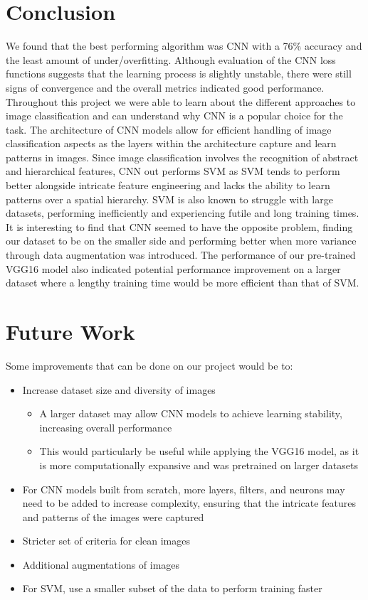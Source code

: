 %

\section{Conclusion}
We found that the best performing algorithm was CNN with a 76\% accuracy and the least amount of under/overfitting. Although evaluation of the CNN loss functions suggests that the learning process is slightly unstable, there were still signs of convergence and the overall metrics indicated good performance. Throughout this project we were able to learn about the different approaches to image classification and can understand why CNN is a popular choice for the task. The architecture of CNN models allow for efficient handling of image classification aspects as the layers within the architecture capture and learn patterns in images. Since image classification involves the recognition of abstract and hierarchical features, CNN out performs SVM as SVM tends to perform better alongside intricate feature engineering and lacks the ability to learn patterns over a spatial hierarchy. SVM is also known to struggle with large datasets, performing inefficiently and experiencing futile and long training times. It is interesting to find that CNN seemed to have the opposite problem, finding our dataset to be on the smaller side and performing better when more variance through data augmentation was introduced. The performance of our pre-trained VGG16 model also indicated potential performance improvement on a larger dataset where a lengthy training time would be more efficient than that of SVM.

\section{Future Work}

Some improvements that can be done on our project would be to:
\begin{itemize}
    \item Increase dataset size and diversity of images
    \begin{itemize}
        \item A larger dataset may allow CNN models to achieve learning stability, increasing overall performance
        \item This would particularly be useful while applying the VGG16 model, as it is more computationally expansive and was pretrained on larger datasets
    \end{itemize}
    \item For CNN models built from scratch, more layers, filters, and neurons may need to be added to increase complexity, ensuring that the intricate features and patterns of the images were captured
    \item Stricter set of criteria for clean images
    \item Additional augmentations of images
    \item For SVM, use a smaller subset of the data to perform training faster
\end{itemize}